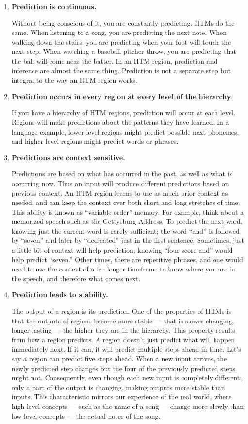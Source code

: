 \documentclass{report}
\begin{document}
\begin{enumerate}
\item {\bf Prediction is continuous.}

Without being conscious of it, you are constantly predicting. HTMs do
the same. When listening to a song, you are predicting the next
note. When walking down the stairs, you are predicting when your foot
will touch the next step. When watching a baseball pitcher throw, you
are predicting that the ball will come near the batter. In an HTM
region, prediction and inference are almost the same thing. Prediction
is not a separate step but integral to the way an HTM region works.

\item {\bf Prediction occurs in every region at every level of the hierarchy.}

If you have a hierarchy of HTM regions, prediction will occur at each
level. Regions will make predictions about the patterns they have
learned. In a language example, lower level regions might predict
possible next phonemes, and higher level regions might predict words
or phrases.

\item {\bf Predictions are context sensitive.}

Predictions are based on what has occurred in the past, as well as
what is occurring now. Thus an input will produce different
predictions based on previous context. An HTM region learns to use as
much prior context as needed, and can keep the context over both short
and long stretches of time. This ability is known as ``variable
order'' memory. For example, think about a memorized speech such as
the Gettysburg Address. To predict the next word, knowing just the
current word is rarely sufficient; the word ``and'' is followed by
``seven'' and later by ``dedicated'' just in the first
sentence. Sometimes, just a little bit of context will help
prediction; knowing ``four score and'' would help predict ``seven.''
Other times, there are repetitive phrases, and one would need to use
the context of a far longer timeframe to know where you are in the
speech, and therefore what comes next.

\item {\bf Prediction leads to stability.}

The output of a region is its prediction. One of the properties of
HTMs is that the outputs of regions become more stable --- that is
slower changing, longer-lasting --- the higher they are in the
hierarchy. This property results from how a region predicts. A region
doesn't just predict what will happen immediately next. If it can, it
will predict multiple steps ahead in time. Let's say a region can
predict five steps ahead. When a new input arrives, the newly
predicted step changes but the four of the previously predicted steps
might not. Consequently, even though each new input is completely
different, only a part of the output is changing, making outputs more
stable than inputs. This characteristic mirrors our experience of the
real world, where high level concepts --- such as the name of a song
--- change more slowly than low level concepts --- the actual notes of
the song.


\end{enumerate}
\end{document}
